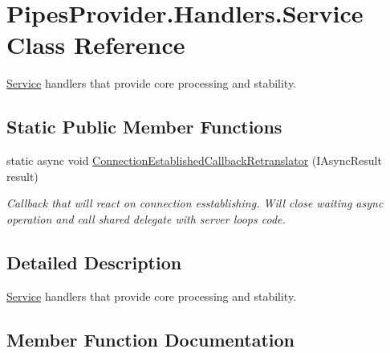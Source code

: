 \hypertarget{class_pipes_provider_1_1_handlers_1_1_service}{}\section{Pipes\+Provider.\+Handlers.\+Service Class Reference}
\label{class_pipes_provider_1_1_handlers_1_1_service}


\mbox{\hyperlink{class_pipes_provider_1_1_handlers_1_1_service}{Service}} handlers that provide core processing and stability.  


\subsection*{Static Public Member Functions}
\begin{DoxyCompactItemize}
\item 
static async void \mbox{\hyperlink{class_pipes_provider_1_1_handlers_1_1_service_af208afd61f2abcb7ff163e5c2c6d81c9}{Connection\+Established\+Callback\+Retranslator}} (I\+Async\+Result result)
\begin{DoxyCompactList}\small\item\em Callback that will react on connection esstablishing. Will close waiting async operation and call shared delegate with server loop\textquotesingle{}s code. \end{DoxyCompactList}\end{DoxyCompactItemize}


\subsection{Detailed Description}
\mbox{\hyperlink{class_pipes_provider_1_1_handlers_1_1_service}{Service}} handlers that provide core processing and stability. 



\subsection{Member Function Documentation}
\mbox{\label{class_pipes_provider_1_1_handlers_1_1_service_af208afd61f2abcb7ff163e5c2c6d81c9}} 
